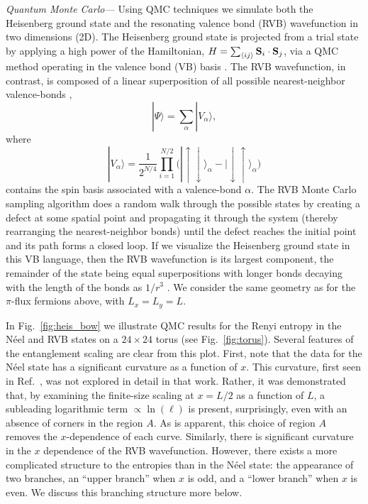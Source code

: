 \documentclass[prl,aps,twocolumn,floatfix,amsmath,amssymb,superscriptaddress,tightenlines]{revtex4}
\begin{document}
{\it Quantum Monte Carlo---}
Using QMC techniques we simulate both the
Heisenberg ground state and the resonating valence bond (RVB)
wavefunction in two dimensions (2D).  The Heisenberg ground state is
projected from a trial state by applying a high power of the
Hamiltonian, $H = \sum_{\langle ij \rangle} {\bf S}_i \cdot {\bf S}_j$, via a QMC method operating in the valence bond (VB)
basis \cite{Sandvik}. %
The RVB wavefunction, in contrast, 
is composed of a linear superposition of all possible 
nearest-neighbor valence-bonds \cite{RVB1,RVB2},
\begin{equation}
| \Psi \rangle = \sum_{\alpha} | V_{\alpha} \rangle,
\end{equation}
where
\begin{equation}
|V_{\alpha} \rangle =  \frac{1}{2^{N/4}} \prod_{i=1}^{N/2} \big( | \uparrow \downarrow \rangle_{\alpha} -  | \downarrow  \uparrow \rangle_{\alpha} \big)
\end{equation}
contains the spin basis associated with a valence-bond $\alpha$.
The RVB 
Monte Carlo sampling
algorithm does a random walk through the possible states by creating a
defect at some spatial point and propagating it through the system (thereby
rearranging the nearest-neighbor bonds) until the defect reaches the
initial point and its path forms a closed loop.
If we visualize the Heisenberg ground state in this VB language, then the RVB wavefunction is its largest component, the remainder of the state being equal superpositions with longer bonds decaying with the length of the bonds as $1/r^3$ \cite{Sandvik}.
We consider the same geometry as for the $\pi$-flux fermions above, with $L_x=L_y=L$.

In Fig.~{\ref{fig:heis_bow}} we illustrate QMC results for the Renyi entropy in the N\'eel and RVB states on a $24 \times 24$ torus (see Fig.~\ref{fig:torus}).  
Several features of the entanglement scaling are clear from this plot.  First, note that the data for the N\'eel state has a significant curvature as a function of $x$.  This curvature, first seen in Ref.~\cite{HeisLog}, was not explored in detail in that work.  Rather, it was demonstrated that, by examining the finite-size scaling at $x=L/2$ as a function of $L$, a subleading logarithmic term $\propto \ln(\ell)$ is present, surprisingly, even with an absence of corners in the region $A$.
As is apparent, this choice of region $A$ removes the $x$-dependence of each curve.  
Similarly, there is significant curvature in the $x$ dependence of the RVB wavefunction.  However, there exists a more complicated structure to the entropies than in the N\'eel state: the appearance of two branches, an ``upper branch'' when $x$ is odd, and a ``lower branch'' when $x$ is even.  We discuss this branching structure more below.
\end{document}
